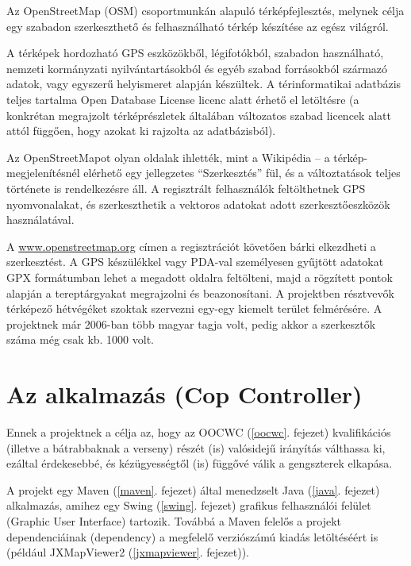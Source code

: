 \documentclass[a4paper,12pt]{report}
\begin{document}
Az OpenStreetMap (OSM) csoportmunkán alapuló térképfejlesztés, melynek célja egy szabadon szerkeszthető és felhasználható térkép készítése az egész világról.

\vspace{2mm}
A térképek hordozható GPS eszközökből, légifotókból, szabadon használható, nemzeti kormányzati nyilvántartásokból és egyéb szabad forrásokból származó adatok, vagy egyszerű helyismeret alapján készültek. A térinformatikai adatbázis teljes tartalma Open Database License licenc alatt érhető el letöltésre \cite{odbl} (a konkrétan megrajzolt térképrészletek általában változatos szabad licencek alatt attól függően, hogy azokat ki rajzolta az adatbázisból).

\vspace{2mm}
Az OpenStreetMapot olyan oldalak ihlették, mint a Wikipédia – a térkép-megjelenítésnél elérhető egy jellegzetes ``Szerkesztés'' fül, és a változtatások teljes története is rendelkezésre áll. A regisztrált felhasználók feltölthetnek GPS nyomvonalakat, és szerkeszthetik a vektoros adatokat adott szerkesztőeszközök használatával.

A \url{www.openstreetmap.org} \cite{osm} címen a regisztrációt követően bárki elkezdheti a szerkesztést. A GPS készülékkel vagy PDA-val személyesen gyűjtött adatokat GPX formátumban lehet a megadott oldalra feltölteni, majd a rögzített pontok alapján a tereptárgyakat megrajzolni és beazonosítani. A projektben résztvevők térképező hétvégéket szoktak szervezni egy-egy kiemelt terület felmérésére. A projektnek már 2006-ban több magyar tagja volt, pedig akkor a szerkesztők száma még csak kb. 1000 volt.

\newpage
\chapter{Az alkalmazás (Cop Controller)}
\label{theapp}

Ennek a projektnek a célja az, hogy az OOCWC (\ref{oocwc}. fejezet) kvalifikációs (illetve a bátrabbaknak a verseny) részét (is) valósidejű irányítás válthassa ki, ezáltal érdekesebbé, és kézügyességtől (is) függővé válik a gengszterek elkapása.

\vspace{2mm}
A projekt egy Maven (\ref{maven}. fejezet) által menedzselt Java (\ref{java}. fejezet) alkalmazás, amihez egy Swing (\ref{swing}. fejezet) grafikus felhasználói felület (Graphic User Interface) tartozik. Továbbá a Maven felelős a projekt dependenciáinak (dependency) a megfelelő verziószámú kiadás letöltéséért is (például JXMapViewer2 \cite{jxmapv} (\ref{jxmapviewer}. fejezet)).
\end{document}
